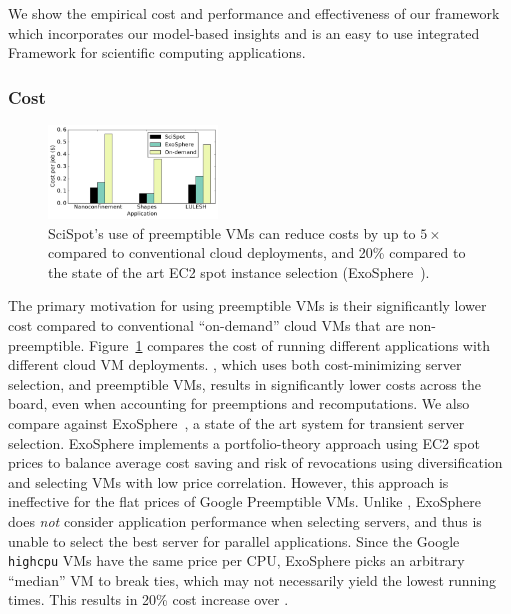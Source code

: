We show the empirical cost and performance and effectiveness of our \sysname framework which incorporates our model-based insights and is an easy to use integrated Framework for scientific computing applications. 


\subsubsection{Cost}





\begin{figure}
  \centering
  \includegraphics[width=0.4\textwidth]{../graphs/cost-vs-exosphere.pdf}
  \vspace*{\myfigspace}
  \caption{SciSpot's use of preemptible VMs can reduce costs by up to $5\times$ compared to conventional cloud deployments, and 20\% compared to the state of the art EC2 spot instance selection (ExoSphere~\cite{exosphere}).}
  \label{fig:cost-only-bar}
    \vspace*{\myfigspace}
\end{figure}

The primary motivation for using preemptible VMs is their significantly lower cost compared to conventional ``on-demand'' cloud VMs that are non-preemptible. 
Figure~\ref{fig:cost-only-bar} compares the cost of running different applications with different cloud VM deployments. 
\sysname, which uses both cost-minimizing server selection, and preemptible VMs, results in significantly lower costs across the board, even when accounting for preemptions and recomputations. 
%
We also compare against ExoSphere~\cite{exosphere}, a state of the art  system for transient server selection.
ExoSphere implements a portfolio-theory approach using EC2 spot prices to balance average cost saving and risk of revocations using diversification and selecting VMs with low price correlation.
However, this approach is ineffective for the flat prices of Google Preemptible VMs. 
Unlike \sysname, ExoSphere does \emph{not} consider application performance when selecting servers, and thus is unable to select the best server for parallel applications. 
Since the Google \texttt{highcpu} VMs have the same price per CPU, ExoSphere picks an arbitrary ``median'' VM to break ties, which may not necessarily yield the lowest running times.
This results in 20\% cost increase over \sysname. 

